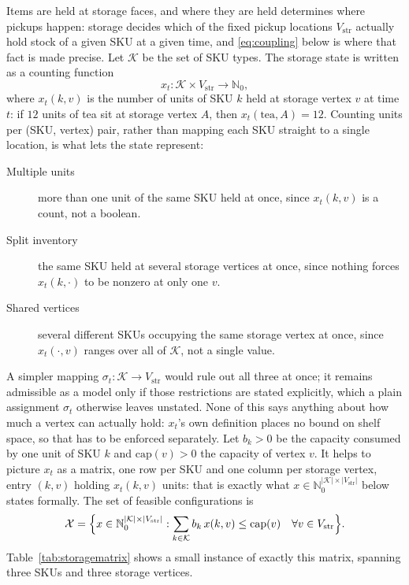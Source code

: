 \documentclass[../main.tex]{subfiles}
\begin{document}
Items are held at storage faces, and where they are held determines where
pickups happen: storage decides which of the fixed pickup locations
$V_{\mathrm{str}}$ actually hold stock of a given SKU at a given time, and
\eqref{eq:coupling} below is where that fact is made precise. Let
$\mathcal{K}$ be the set of SKU types. The storage state is written as a
counting function
\[
  x_t : \mathcal{K} \times V_{\mathrm{str}} \to \mathbb{N}_0 ,
\]
where $x_t(k,v)$ is the number of units of SKU $k$ held at storage vertex
$v$ at time $t$: if $12$ units of tea sit at storage vertex $A$, then
$x_t(\mathrm{tea},A) = 12$. Counting units per (SKU, vertex) pair, rather than mapping
each SKU straight to a single location, is what lets the state represent:
\begin{description}
  \item[Multiple units] more than one unit of the same SKU held at once,
    since $x_t(k,v)$ is a count, not a boolean.
  \item[Split inventory] the same SKU held at several storage vertices at
    once, since nothing forces $x_t(k,\cdot)$ to be nonzero at only one $v$.
  \item[Shared vertices] several different SKUs occupying the same storage
    vertex at once, since $x_t(\cdot,v)$ ranges over all of $\mathcal{K}$,
    not a single value.
\end{description}
A simpler mapping $\sigma_t : \mathcal{K} \to V_{\mathrm{str}}$ would rule out
all three at once; it remains admissible as a model only if those
restrictions are stated explicitly, which a plain assignment $\sigma_t$
otherwise leaves unstated. None of this says anything about how much a
vertex can actually hold: $x_t$'s own definition places no bound on shelf
space, so that has to be enforced separately. Let $b_k > 0$ be the capacity
consumed by one unit of SKU $k$ and $\mathrm{cap}(v) > 0$ the capacity of
vertex $v$. It helps to picture $x_t$ as a matrix, one row per SKU and one
column per storage vertex, entry $(k,v)$ holding $x_t(k,v)$ units: that is
exactly what $x \in \mathbb{N}_0^{|\mathcal{K}| \times |V_{\mathrm{str}}|}$
below states formally. The set of feasible configurations is
\begin{equation}
  \mathcal{X} =
  \Bigl\{ x \in \mathbb{N}_0^{|\mathcal{K}| \times |V_{\mathrm{str}}|} :
    \sum_{k \in \mathcal{K}} b_k\, x(k,v) \le \mathrm{cap}(v)
    \quad \forall v \in V_{\mathrm{str}} \Bigr\}.
  \label{eq:feasiblestorage}
\end{equation}
Table~\ref{tab:storagematrix} shows a small instance of exactly this
matrix, spanning three SKUs and three storage vertices.
\end{document}
